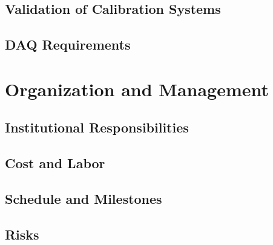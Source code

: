 
\subsection{Validation of Calibration Systems}
\label{sec:sp-calib-val}


\subsection{DAQ Requirements}
\label{sec:sp-calib-daqreq}

\section{Organization and Management}
\label{sec:sp-calib-org}

\subsection{Institutional Responsibilities}
\label{sec:sp-calib-resp}

\subsection{Cost and Labor}
\label{sec:sp-calib-cost}

\subsection{Schedule and Milestones}
\label{sec:sp-calib-sched}

\subsection{Risks}
\label{sec:sp-calib-risks}

